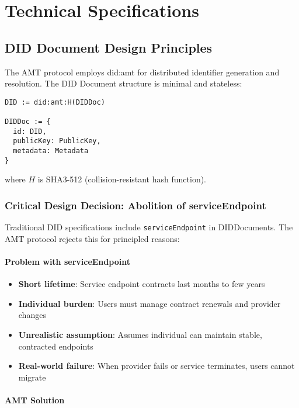 \chapter{Technical Specifications}

\section{DID Document Design Principles}

The AMT protocol employs did:amt for distributed identifier generation and resolution. The DID Document structure is minimal and stateless:

\begin{verbatim}
DID := did:amt:H(DIDDoc)

DIDDoc := {
  id: DID,
  publicKey: PublicKey,
  metadata: Metadata
}
\end{verbatim}

where $H$ is SHA3-512 (collision-resistant hash function).

\subsection{Critical Design Decision: Abolition of serviceEndpoint}

Traditional DID specifications include \texttt{serviceEndpoint} in DIDDocuments. The AMT protocol rejects this for principled reasons:

\subsubsection{Problem with serviceEndpoint}

\begin{itemize}
  \item \textbf{Short lifetime}: Service endpoint contracts last months to few years
  \item \textbf{Individual burden}: Users must manage contract renewals and provider changes
  \item \textbf{Unrealistic assumption}: Assumes individual can maintain stable, contracted endpoints
  \item \textbf{Real-world failure}: When provider fails or service terminates, users cannot migrate
\end{itemize}

\subsubsection{AMT Solution}

